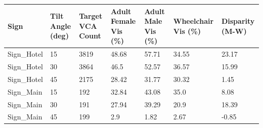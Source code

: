 \begin{tabular}{lllllll}
\hline
Sign & Tilt Angle (deg) & Target VCA Count & Adult Female Vis (\%) & Adult Male Vis (\%) & Wheelchair Vis (\%) & Disparity (M-W) \\ \hline
Sign\_Hotel & 15 & 3819 & 48.68 & 57.71 & 34.55 & 23.17 \\
Sign\_Hotel & 30 & 3864 & 46.5 & 52.57 & 36.57 & 15.99 \\
Sign\_Hotel & 45 & 2175 & 28.42 & 31.77 & 30.32 & 1.45 \\
Sign\_Main & 15 & 192 & 32.84 & 43.08 & 35.0 & 8.08 \\
Sign\_Main & 30 & 191 & 27.94 & 39.29 & 20.9 & 18.39 \\
Sign\_Main & 45 & 199 & 2.9 & 1.82 & 2.67 & -0.85 \\
\hline
\end{tabular}
